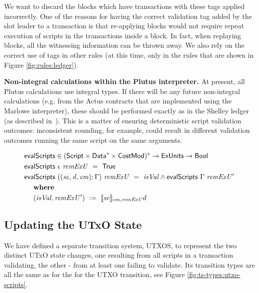 We want to
discard the blocks which have transactions with these tags
applied incorrectly.
One of the reasons for having the correct validation tag added by the slot leader
to a transaction is that re-applying blocks would not require repeat
execution of scripts in the transactions inside a block. In fact, when replaying
blocks, all the witnessing information can be thrown away.
We also rely on the correct use of tags in other rules (at this time, only in
the rules that are shown in Figure \ref{fig:rules:ledger}).


\textbf{Non-integral calculations within the Plutus interpreter.} At present, all Plutus calculations use integral types. If there
will be any future non-integral calculations (e.g. from the Actus contracts that are implemented using
the Marlowe interpreter), these should
be performed exactly as in the Shelley ledger (as described in~\cite{non_int}). This is a matter of
ensuring deterministic script validation outcomes: inconsistent rounding, for example, could
result in different validation outcomes running the same script on the same
arguments.

\begin{figure}[htb]
  \begin{align*}
    & \mathsf{evalScripts} \in (\mathsf{Script} \times \mathsf{Data}^{*} \times \mathsf{CostMod})^{*} \to \mathsf{ExUnits} \to \mathsf{Bool} \\
    & \mathsf{evalScripts}~\epsilon~\mathit{remExU}~=~\mathsf{True} \\
    & \mathsf{evalScripts}~((\mathit{sc}, \mathit{d}, \mathit{cm});\Gamma)~\mathit{remExU}~=~
      \mathit{isVal} \land \mathsf{evalScripts}~\Gamma~\mathit{remExU'} \\
    & ~~~ ~ \mathbf{where}~ ~  \\
    & ~~~~ (\mathit{isVal},\mathit{remExU'})~:=~ \llbracket sc \rrbracket_{cm,\mathit{remExU}} d
  \end{align*}
\end{figure}

\subsection{Updating the UTxO State}
\label{sec:utxo-state-trans}

We have defined a separate transition system, UTXOS, to represent the two distinct
UTxO state changes, one resulting from all scripts in a transaction validating,
the other - from at least one failing to validate. Its transition types
are all the same as for the for the UTXO transition, see Figure
\ref{fig:ts-types:utxo-scripts}.

